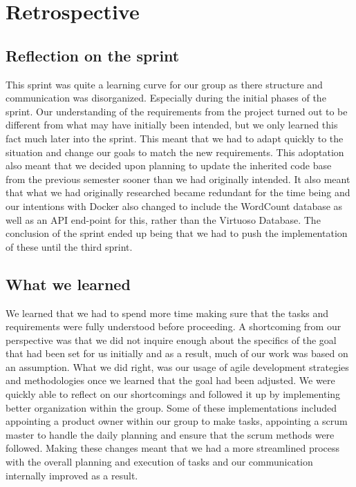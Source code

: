 \section{Retrospective}

\subsection{Reflection on the sprint}
This sprint was quite a learning curve for our group as there structure and communication was disorganized. Especially during the initial phases of the sprint. Our understanding of the requirements from the \knox{} project turned out to be different from what may have initially been intended, but we only learned this fact much later into the sprint. This meant that we had to adapt quickly to the situation and change our goals to match the new requirements. This adoptation also meant that we decided upon planning to update the inherited code base from the previous semester sooner than we had originally intended. It also meant that what we had originally researched became redundant for the time being and our intentions with Docker also changed to include the WordCount database as well as an API end-point for this, rather than the Virtuoso Database. The conclusion of the sprint ended up being that we had to push the implementation of these until the third sprint.

\subsection{What we learned}
We learned that we had to spend more time making sure that the tasks and requirements were fully understood before proceeding. A shortcoming from our perspective was that we did not inquire enough about the specifics of the goal that had been set for us initially and as a result, much of our work was based on an assumption. 
What we did right, was our usage of agile development strategies and methodologies once we learned that the goal had been adjusted. We were quickly able to reflect on our shortcomings and followed it up by implementing better organization within the group. Some of these implementations included appointing a product owner within our group to make tasks, appointing a scrum master to handle the daily planning and ensure that the scrum methods were followed. Making these changes meant that we had a more streamlined process with the overall planning and execution of tasks and our communication internally improved as a result.

